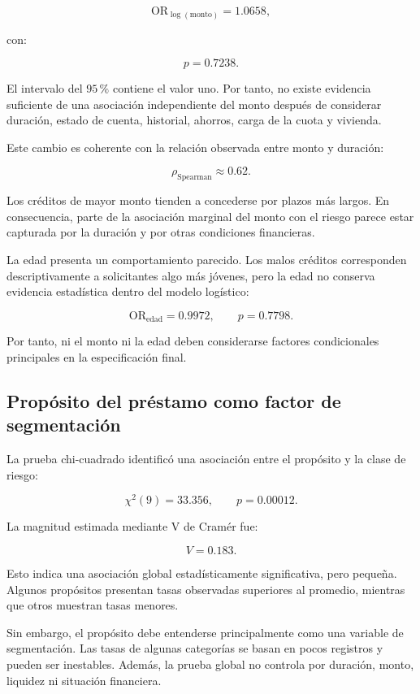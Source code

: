 \[
\mathrm{OR}_{\log(\mathrm{monto})}
=
1.0658,
\]

con:

\[
p=0.7238.
\]

El intervalo del \(95\,\%\) contiene el valor uno. Por tanto, no existe
evidencia suficiente de una asociación independiente del monto después
de considerar duración, estado de cuenta, historial, ahorros, carga de
la cuota y vivienda.

Este cambio es coherente con la relación observada entre monto y
duración:

\[
\rho_{\mathrm{Spearman}}
\approx
0.62.
\]

Los créditos de mayor monto tienden a concederse por plazos más largos.
En consecuencia, parte de la asociación marginal del monto con el riesgo
parece estar capturada por la duración y por otras condiciones
financieras.

La edad presenta un comportamiento parecido. Los malos créditos
corresponden descriptivamente a solicitantes algo más jóvenes, pero la
edad no conserva evidencia estadística dentro del modelo logístico:

\[
\mathrm{OR}_{\mathrm{edad}}
=
0.9972,
\qquad
p=0.7798.
\]

Por tanto, ni el monto ni la edad deben considerarse factores
condicionales principales en la especificación final.

\subsection{Propósito del préstamo como factor de segmentación}

La prueba chi-cuadrado identificó una asociación entre el propósito y la
clase de riesgo:

\[
\chi^2(9)
=
33.356,
\qquad
p=0.00012.
\]

La magnitud estimada mediante V de Cramér fue:

\[
V=0.183.
\]

Esto indica una asociación global estadísticamente significativa, pero
pequeña. Algunos propósitos presentan tasas observadas superiores al
promedio, mientras que otros muestran tasas menores.

Sin embargo, el propósito debe entenderse principalmente como una
variable de segmentación. Las tasas de algunas categorías se basan en
pocos registros y pueden ser inestables. Además, la prueba global no
controla por duración, monto, liquidez ni situación financiera.

